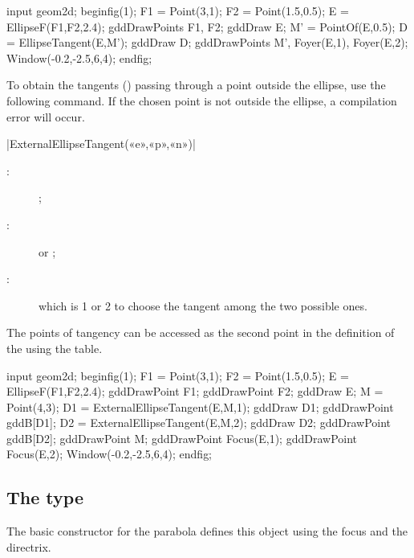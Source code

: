 \documentclass[a4paper,english]{article}
\begin{document}
\begin{ExempleMP}
input geom2d;
beginfig(1);
F1 = Point(3,1);
F2 = Point(1.5,0.5);
E = EllipseF(F1,F2,2.4);
gddDrawPoints F1, F2;
gddDraw E;
M' = PointOf(E,0.5);
D = EllipseTangent(E,M');
gddDraw D;
gddDrawPoints M', Foyer(E,1), Foyer(E,2);
Window(-0.2,-2.5,6,4);
endfig;
\end{ExempleMP}


To obtain the tangents () passing through a point outside the
ellipse, use the following command. If the chosen point is not outside the
ellipse, a compilation error will occur.

\begin{colourband}
\macro|ExternalEllipseTangent(«e»,«p»,«n»)|
\begin{description}
  \item[:]   ;
  \item[:]   or  ;
  \item[:]  which is 1 or 2 to choose the tangent among
  the two possible ones.
\end{description}
\end{colourband}
\bigskip

The points of tangency can be accessed as the second point in the definition of
the  using the  table.

\begin{ExempleMP}
input geom2d;
beginfig(1);
F1 = Point(3,1);
F2 = Point(1.5,0.5);
E = EllipseF(F1,F2,2.4);
gddDrawPoint F1; gddDrawPoint F2;
gddDraw E;
M = Point(4,3);
D1 = ExternalEllipseTangent(E,M,1);
gddDraw D1;
gddDrawPoint gddB[D1];
D2 = ExternalEllipseTangent(E,M,2);
gddDraw D2;
gddDrawPoint gddB[D2];
gddDrawPoint M;
gddDrawPoint Focus(E,1);
gddDrawPoint Focus(E,2);
Window(-0.2,-2.5,6,4);
endfig;
\end{ExempleMP}

\subsection{The  type}

The basic constructor for the parabola defines this object using the focus and
the directrix. 
\end{document}
